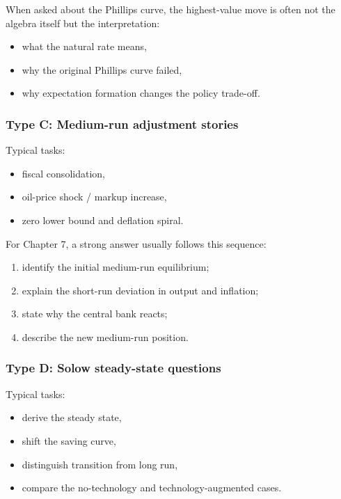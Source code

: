 \documentclass[12pt]{article}
\begin{document}
\begin{examtip}[title={Exam Focus: What the examiner often wants}]
When asked about the Phillips curve, the highest-value move is often not the algebra itself but the interpretation:
\begin{itemize}[leftmargin=1.5em]
    \item what the natural rate means,
    \item why the original Phillips curve failed,
    \item why expectation formation changes the policy trade-off.
\end{itemize}
\end{examtip}

\subsubsection*{Type C: Medium-run adjustment stories}

Typical tasks:
\begin{itemize}[leftmargin=1.5em]
    \item fiscal consolidation,
    \item oil-price shock / markup increase,
    \item zero lower bound and deflation spiral.
\end{itemize}

\begin{examtip}[title={Exam Focus: Standard medium-run narrative}]
For Chapter 7, a strong answer usually follows this sequence:
\begin{enumerate}[leftmargin=1.5em]
    \item identify the initial medium-run equilibrium;
    \item explain the short-run deviation in output and inflation;
    \item state why the central bank reacts;
    \item describe the new medium-run position.
\end{enumerate}
\end{examtip}

\subsubsection*{Type D: Solow steady-state questions}

Typical tasks:
\begin{itemize}[leftmargin=1.5em]
    \item derive the steady state,
    \item shift the saving curve,
    \item distinguish transition from long run,
    \item compare the no-technology and technology-augmented cases.
\end{itemize}
\end{document}

